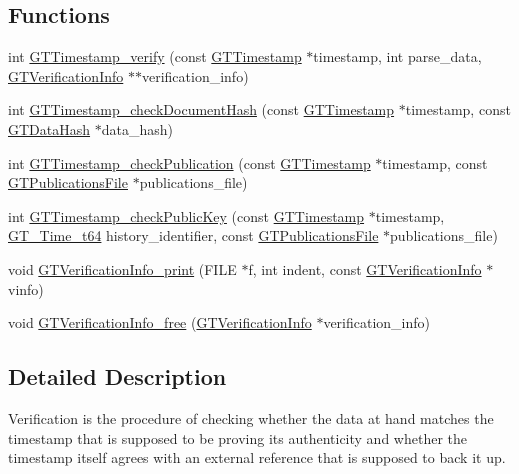 \subsection*{Functions}
\begin{DoxyCompactItemize}
\item 
int \hyperlink{group__verification_gabb2faaa480064b6aad83582b80aa2c53}{GTTimestamp\_\-verify} (const \hyperlink{group__timestamps_gaddb792efe52216386853c94e7aeaf6ba}{GTTimestamp} $\ast$timestamp, int parse\_\-data, \hyperlink{struct_g_t_verification_info__st}{GTVerificationInfo} $\ast$$\ast$verification\_\-info)
\item 
int \hyperlink{group__verification_ga578626c0b001a90e666691f17f08f5c9}{GTTimestamp\_\-checkDocumentHash} (const \hyperlink{group__timestamps_gaddb792efe52216386853c94e7aeaf6ba}{GTTimestamp} $\ast$timestamp, const \hyperlink{struct_g_t_message_digest__st}{GTDataHash} $\ast$data\_\-hash)
\item 
int \hyperlink{group__verification_ga7d73ddba1e350c4cfb7c65086f483be9}{GTTimestamp\_\-checkPublication} (const \hyperlink{group__timestamps_gaddb792efe52216386853c94e7aeaf6ba}{GTTimestamp} $\ast$timestamp, const \hyperlink{group__publications_gacf561fdbce4067eb94bd9761a71e7e5a}{GTPublicationsFile} $\ast$publications\_\-file)
\item 
int \hyperlink{group__verification_ga317e993f5755ea8aff80335ef252ee04}{GTTimestamp\_\-checkPublicKey} (const \hyperlink{group__timestamps_gaddb792efe52216386853c94e7aeaf6ba}{GTTimestamp} $\ast$timestamp, \hyperlink{group__common_ga4cc54826c21e0ed438d8e35be7039328}{GT\_\-Time\_\-t64} history\_\-identifier, const \hyperlink{group__publications_gacf561fdbce4067eb94bd9761a71e7e5a}{GTPublicationsFile} $\ast$publications\_\-file)
\item 
void \hyperlink{group__verification_ga6c88243f78456ebc09cdc7854ade5589}{GTVerificationInfo\_\-print} (FILE $\ast$f, int indent, const \hyperlink{struct_g_t_verification_info__st}{GTVerificationInfo} $\ast$vinfo)
\item 
void \hyperlink{group__verification_ga39c2deaa12477a4a2ebadbe67672243e}{GTVerificationInfo\_\-free} (\hyperlink{struct_g_t_verification_info__st}{GTVerificationInfo} $\ast$verification\_\-info)
\end{DoxyCompactItemize}


\subsection{Detailed Description}
Verification is the procedure of checking whether the data at hand matches the timestamp that is supposed to be proving its authenticity and whether the timestamp itself agrees with an external reference that is supposed to back it up.

